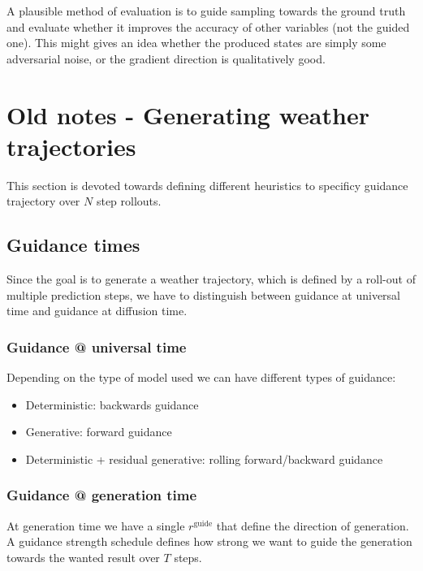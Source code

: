 \documentclass[a4paper,12pt]{article}
\begin{document}
A plausible method of evaluation is to guide sampling towards the ground truth and evaluate whether it improves the accuracy of other variables (not the guided one).
This might gives an idea whether the produced states are simply some adversarial noise, or the gradient direction is qualitatively good.

\clearpage
\section{Old notes - Generating weather trajectories}

This section is devoted towards defining different heuristics to specificy guidance trajectory over $N$ step rollouts.

\subsection{Guidance times}
Since the goal is to generate a weather trajectory, which is defined by a roll-out of multiple prediction steps, we have to distinguish between guidance at universal time and guidance at diffusion time.

\subsubsection{Guidance @ universal time}

Depending on the type of model used we can have different types of guidance: 
\begin{itemize}
    \item Deterministic: backwards guidance
    \item Generative: forward guidance
    \item Deterministic + residual generative: rolling forward/backward guidance
\end{itemize}

\subsubsection{Guidance @ generation time}
At generation time we have a single $r^\text{guide}$ that define the direction of generation. A guidance strength schedule defines how strong we want to guide the generation towards the wanted result over $T$ steps.
\end{document}
